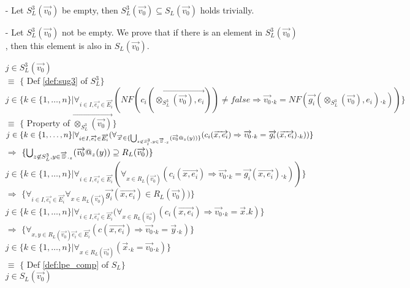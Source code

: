 \index{}\documentclass[a4paper,10pt]{article}
\theoremstyle{plain}
\theoremstyle{definition}
\newcommand{\ovr}{\overrightarrow}
\begin{document}
\begin{itemize}
\newcommand{\tmp}{\vspace{8pt}}

\item[-] Let $S_L^3(\ovr{v_0})$ be empty, then $S_L^3(\ovr{v_0}) \subseteq S_L(\ovr{v_0})$ holds trivially.
\item[-] Let $S_L^3(\ovr{v_0})$ not be empty. We prove that if there is an element in $S_L^3(\ovr{v_0})$, then this element is also in $S_L(\ovr{v_0})$. \newline \newline

\tmp $ j \in S_L^3(\ovr{v_0})$ \\ 
\tmp $ \equiv $ \hspace{20pt} $\lbrace$ Def \ref{def:sug3} of $S_L^3 \rbrace$ \\ 
\tmp $ j \in \lbrace k \in \lbrace 1, \ldots, n \rbrace \vert \forall_{i \in I, \ovr{e_i} \in \ovr{E_i}}(NF(c_i(\ovr{\otimes_{S_L^3}(\ovr{v_0}), e_i})) \neq false \Rightarrow \ovr{v_0}._k = NF(\ovr{g_i}(\otimes_{S_L^3}(\ovr{v_0}), e_i)._k) ) \rbrace$ \\
\tmp $ \equiv $ \hspace{20pt} $\lbrace$ Property of $\ovr{\otimes_{S_L^3}(\ovr{v_0})}\rbrace$ \\ 
\tmp $ j \in \lbrace k \in \lbrace 1, \ldots, n \rbrace \vert \forall_{i \in I, \ovr{e_i} \in \ovr{E_i}}(\forall_{\ovr{x} \in \lbrace \bigcup_{z \not\in S_l^3, y \in \ovr{\Bbb{D}}._{z}} (\ovr{v_0}@_{z}(y) ) \rbrace}(c_i(\ovr{x, e_i}) \Rightarrow \ovr{v_0}._k = \ovr{g_i}(\ovr{x, e_i})._k )) \rbrace$\\
\tmp $ \Rightarrow$ \hspace{20pt} $\lbrace \bigcup_{z \not\in S_L^3, y \in \ovr{\Bbb{D}}._{z}} (\ovr{v_0}@_{z}(y) ) \supseteq R_L(\ovr{v_0}) \rbrace$  \\
\tmp $ j \in \lbrace k \in \lbrace 1, \ldots, n \rbrace \vert \forall_{i \in I, \ovr{e_i} \in \ovr{E_i}}(\forall_{x \in R_L(\ovr{v_0})}( c_i(\ovr{x, e_i})  \Rightarrow \ovr{v_0}._k = \ovr{g_i}(\ovr{x, e_i})._k )) \rbrace$\\
\tmp $\Rightarrow$ \hspace{20pt} $\lbrace \forall_{i \in I, \ovr{e_i} \in \ovr{E_i}} \forall_{x \in R_L(\ovr{v_0})}
\ovr{g_i}(\ovr{x, e_i}) \in R_L(\ovr{v_0}) ) \rbrace$\\
\tmp $ j \in \lbrace k \in \lbrace 1, \ldots, n \rbrace \vert \forall_{i \in I, \ovr{e_i} \in \ovr{E_i}}(\forall_{x \in R_L(\ovr{v_0})}( c_i(\ovr{x, e_i})  \Rightarrow \ovr{v_0}._k = \ovr{x}.k) \rbrace$\\
\tmp $\Rightarrow$ \hspace*{20pt} $\lbrace \forall_{x,y \in R_L(\ovr{v_0})\ovr{e_i} \in \ovr{E_i}}(c(\ovr{x,e_i}) \Rightarrow \ovr{v_0}._k = \ovr{y}._k)\rbrace$ \\
\tmp $ j \in \lbrace k \in \lbrace 1, \ldots, n \rbrace \vert \forall_{x \in R_L(\ovr{v_0})}(\ovr{x}._k = \ovr{v_0}._k) \rbrace$\\
\tmp $ \equiv$ \hspace{20pt} $\lbrace$ Def \ref{def:lpe_comp} of $S_L\rbrace$\\
\tmp $ j \in S_L(\ovr{v_0})$


\end{itemize}
\end{document}
